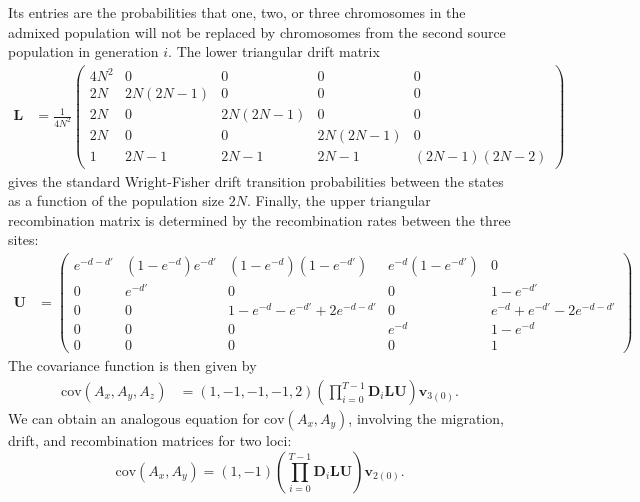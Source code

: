 Its entries are the probabilities that one, two, or three chromosomes in the admixed population will not be replaced by chromosomes from the second source population in generation $i$. The lower triangular drift matrix 
\begin{align*}
	\mathbf{L}&=\frac{1}{4N^2}\left( \begin{array}{ccccc}
					 4N^2 		& 0 	& 0 & 0 & 0\\
					 2N 	& 2N(2N-1) & 0 & 0 & 0\\
					 2N 	& 0 & 2N(2N-1) & 0 & 0\\
					 2N 	& 0 & 0 & 2N(2N-1) & 0\\
					 1 & 2N-1 & 2N-1 & 2N-1 & (2N-1)(2N-2)
				\end{array} \right)
\end{align*}
gives the standard Wright-Fisher drift transition probabilities between the states as a function of the population size $2N$. Finally, the upper triangular recombination matrix is determined by the recombination rates between the three sites:
\begin{align*}
	\mathbf{U} &=
		\left( \begin{array}{ccccc}
		e^{-d-d'} & (1-e^{-d})e^{-d'} & (1-e^{-d})(1-e^{-d'}) & e^{-d}(1-e^{-d'}) & 0 \\
		0 & e^{-d'} & 0 & 0 & 1-e^{-d'} \\
		0 & 0 & 1-e^{-d}-e^{-d'}+2e^{-d-d'} & 0 & e^{-d}+e^{-d'}-2e^{-d-d'} \\ 
		0 & 0 & 0 & e^{-d} & 1-e^{-d} \\ 
		0 & 0 & 0 & 0 & 1 \end{array} \right)
\end{align*}
The covariance function is then given by
\begin{align}
	\text{cov}(A_x,A_y,A_z) &= \left(1,-1,-1,-1,2\right)\left(\prod_{i=0}^{T-1} \textbf{D}_i \mathbf{L}\mathbf{U}\right)\textbf{v}_{3(0)}.
	\label{cov}
\end{align} 
We can obtain an analogous equation for $\text{cov}(A_x,A_y)$, involving the migration, drift, and recombination matrices for two loci:
$$
	\text{cov}(A_x,A_y) = \left(1,-1\right)\left(\prod_{i=0}^{T-1} \textbf{D}_i \mathbf{L}\mathbf{U}\right)\textbf{v}_{2(0)}.
$$

